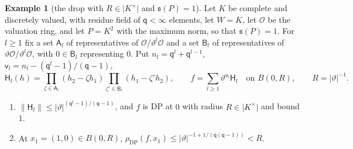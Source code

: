\documentclass[11pt]{amsart}
\theoremstyle{definition}
\theoremstyle{remark}
\numberwithin{equation}{section}
\newcommand{\abs}[1]{\lvert #1\rvert}
\newcommand{\norm}[1]{\lVert #1\rVert}
\theoremstyle{plain}
\theoremstyle{definition}
\newtheorem{example}[theorem]{Example}
\theoremstyle{plain}
\begin{document}
\begin{example}[the drop with $R\in\abs{K^\times}$ and $\mathfrak s(P)=1$]\label{dp:ex:radius-drop-b}
Let $K$ be complete and discretely valued, with residue field of $\mathsf q<\infty$ elements, let $W=K$, let $\mathcal O$ be the valuation ring, and let $P=K^2$ with the maximum norm, so that $\mathfrak s(P)=1$. For $l\ge1$ fix a set $\mathsf A_l$ of representatives of $\mathcal O/\vartheta^l\mathcal O$ and a set $\mathsf B_l$ of representatives of $\vartheta\mathcal O/\vartheta^l\mathcal O$, with $0\in\mathsf B_l$ representing $0$. Put $n_l=\mathsf q^l+\mathsf q^{l-1}$, $\mathsf v_l=n_l-(\mathsf q^l-1)/(\mathsf q-1)$,
\[
 \mathsf H_l(h)=\prod_{\zeta\in\mathsf A_l}(h_2-\zeta h_1)\prod_{\zeta'\in\mathsf B_l}(h_1-\zeta'h_2),\qquad f=\sum_{l\ge1}\vartheta^{\mathsf v_l}\mathsf H_l\quad\text{on }B(0,R),\qquad R=\abs\vartheta^{-1}.
\]
\begin{enumerate}
\item $\norm{\mathsf H_l}\le\abs\vartheta^{(\mathsf q^l-1)/(\mathsf q-1)}$, and $f$ is DP at $0$ with radius $R\in\abs{K^\times}$ and bound $1$.
\item At $x_1=(1,0)\in B(0,R)$, $\rho_{\mathrm{DP}}(f,x_1)\le\abs\vartheta^{-1+1/(\mathsf q(\mathsf q-1))}<R$.
\end{enumerate}
\end{example}
\end{document}
